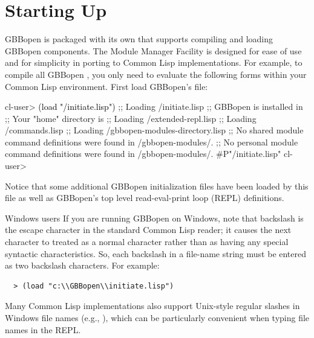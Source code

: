 \documentclass[10pt,twoside,english,pdftex]{article}
\begin{document}

\T\markright{}%
\T\pagestyle{plain}
\T\cleardoublepage
\W{}
\T\pagestyle{fancy}
\T\thispagestyle{fancybottom}
\T\global\def\fnlastname{ }%
\section{Starting Up}
\label{sec:startup}%

GBBopen is packaged with its own 
that supports compiling and loading GBBopen components.  The Module Manager
Facility is designed for ease of use and for simplicity in porting to Common
Lisp implementations.  For example, to compile all GBBopen ,
you only need to evaluate the following forms within your Common Lisp
environment.  First load GBBopen's
 file:
%
\W\supp
\begin{smallexample}
\textcolor{darkergray}{%
  cl-user> \textcolor{black}{(load "/initiate.lisp")}
  ;; Loading /initiate.lisp
  ;; GBBopen is installed in 
  ;; Your "home" directory is 
  ;;     Loading /extended-repl.lisp
  ;;     Loading /commands.lisp
  ;;     Loading /gbbopen-modules-directory.lisp
  ;; No shared module command definitions were found in /gbbopen-modules/.
  ;; No personal module command definitions were found in /gbbopen-modules/.
  #P"/initiate.lisp"
  cl-user>}
\end{smallexample}
%
Notice that some additional GBBopen initialization files have been loaded by
this file as well as GBBopen's top level read-eval-print loop (REPL)
 definitions.

\begin{notebox}{Windows users}
%
%
If you are running GBBopen on Windows, note that backslash is the
escape character in the standard Common Lisp reader; it causes the
next character to treated as a normal character rather than as having
any special syntactic characteristics. So, each backslash in a
file-name string must be entered as two backslash characters.
For example:
%
\W\supp\notpretop
\begin{verbatim}
  > (load "c:\\GBBopen\\initiate.lisp")
\end{verbatim}

Many Common Lisp implementations also support Unix-style regular slashes in
Windows file names (e.g., ), which can
be particularly convenient when typing file names in the REPL.
\end{notebox}
\end{document}
